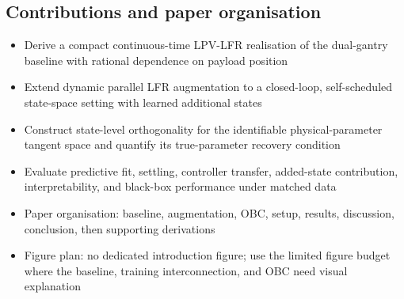 \subsection{Contributions and paper organisation}
\begin{itemize}
\item Derive a compact continuous-time LPV-LFR realisation of the dual-gantry baseline with rational dependence on payload position
\item Extend dynamic parallel LFR augmentation to a closed-loop, self-scheduled state-space setting with learned additional states
\item Construct state-level orthogonality for the identifiable physical-parameter tangent space and quantify its true-parameter recovery condition
\item Evaluate predictive fit, settling, controller transfer, added-state contribution, interpretability, and black-box performance under matched data
\item Paper organisation: baseline, augmentation, OBC, setup, results, discussion, conclusion, then supporting derivations
\item Figure plan: no dedicated introduction figure; use the limited figure budget where the baseline, training interconnection, and OBC need visual explanation
\end{itemize}
